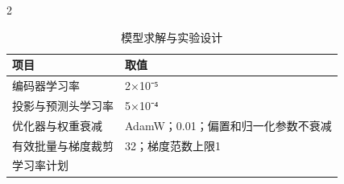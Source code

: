 \begin{PaperTable}{2}

\begin{table}[!htbp]
\centering\caption{模型求解与实验设计}
\begin{tabular}{@{}ll@{}}
\toprule
\begin{minipage}[b]{\dimexpr 0.310000\linewidth-0.620000\tabcolsep\relax}\raggedright
项目\strut
\end{minipage} & \begin{minipage}[b]{\dimexpr 0.690000\linewidth-1.380000\tabcolsep\relax}\raggedright
取值\strut
\end{minipage}\tabularnewline
\midrule

\begin{minipage}[t]{\dimexpr 0.310000\linewidth-0.620000\tabcolsep\relax}\raggedright
编码器学习率\strut
\end{minipage} & \begin{minipage}[t]{\dimexpr 0.690000\linewidth-1.380000\tabcolsep\relax}\raggedright
2×10⁻⁵\strut
\end{minipage}\tabularnewline
\begin{minipage}[t]{\dimexpr 0.310000\linewidth-0.620000\tabcolsep\relax}\raggedright
投影与预测头学习率\strut
\end{minipage} & \begin{minipage}[t]{\dimexpr 0.690000\linewidth-1.380000\tabcolsep\relax}\raggedright
5×10⁻⁴\strut
\end{minipage}\tabularnewline
\begin{minipage}[t]{\dimexpr 0.310000\linewidth-0.620000\tabcolsep\relax}\raggedright
优化器与权重衰减\strut
\end{minipage} & \begin{minipage}[t]{\dimexpr 0.690000\linewidth-1.380000\tabcolsep\relax}\raggedright
AdamW；0.01；偏置和归一化参数不衰减\strut
\end{minipage}\tabularnewline
\begin{minipage}[t]{\dimexpr 0.310000\linewidth-0.620000\tabcolsep\relax}\raggedright
有效批量与梯度裁剪\strut
\end{minipage} & \begin{minipage}[t]{\dimexpr 0.690000\linewidth-1.380000\tabcolsep\relax}\raggedright
32；梯度范数上限1\strut
\end{minipage}\tabularnewline
\begin{minipage}[t]{\dimexpr 0.310000\linewidth-0.620000\tabcolsep\relax}\raggedright
学习率计划\strut
\end{minipage} & \begin{minipage}[t]{\dimexpr 0.690000\linewidth-1.380000\tabcolsep\relax}\raggedright

\end{minipage}
\end{tabular}
\end{table}
\end{PaperTable}
